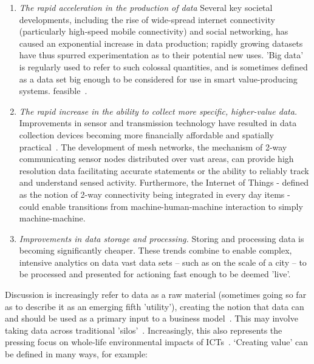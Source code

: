 \documentclass[journal]{IEEEtran}
\begin{document}
\begin{enumerate}
\item {\emph{The rapid acceleration in the production of data}}
Several key societal developments, including the rise of wide-spread
internet connectivity (particularly high-speed mobile connectivity)
and social networking, has caused an exponential increase in data
production; rapidly growing datasets have thus spurred experimentation
as to their potential new uses. 'Big data' is regularly used to refer
to such colossal quantities, and is sometimes defined as a data set
big enough to be considered for use in smart value-producing
systems. feasible~\cite{hollands:2008,ibmsmartcities:2009,ciscoconcities:2010}.
\item {\emph{The rapid increase in the ability to collect more
specific, higher-value data.}} Improvements in sensor and transmission
technology have resulted in data collection devices becoming more
financially affordable and spatially
practical~\cite{townsend:2013}. The development of mesh networks, the
mechanism of 2-way communicating sensor nodes distributed over vast areas, can
provide high resolution data facilitating accurate statements or the
ability to reliably track and understand sensed activity. Furthermore,
the Internet of Things - defined as the notion of 2-way connectivity
being integrated in every day items - could enable transitions from
machine-human-machine interaction to simply machine-machine.
\item {\emph{Improvements in data storage and processing.}}  Storing
and processing data is becoming significantly cheaper. These trends
combine to enable complex, intensive analytics on data vast data sets
-- such as on the scale of a city -- to be processed and presented for
actioning fast enough to be deemed 'live'.
\end{enumerate}

Discussion is increasingly refer to data as a raw material (sometimes
going so far as to describe it as an emerging fifth 'utility'),
creating the notion that data can and should be used as a primary
input to a business model~\cite{arup-et-al:2011}. This may involve
taking data across traditional
'silos'~\cite{shapiro:2006,tsoukalas:2008}. Increasingly, this also
represents the pressing focus on whole-life environmental impacts of
ICTs~\cite{cooper-et-al-gsict:2015}.  `Creating value' can be defined
in many ways, for example:
\end{document}
